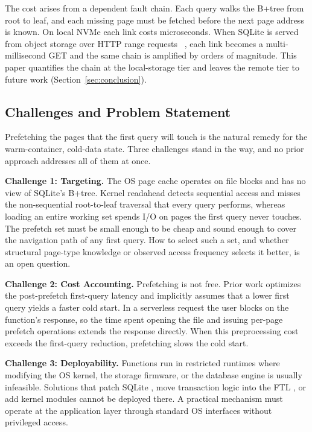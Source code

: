 \documentclass[sigconf, nonacm]{acmart}
\begin{document}
The cost arises from a dependent fault chain. Each query walks the B+tree from root to leaf, and each missing page must be fetched before the next page address is known. On local NVMe each link costs microseconds. When SQLite is served from object storage over HTTP range requests ~\cite{SqliteWebVfs, Turbolite}, each link becomes a multi-millisecond GET and the same chain is amplified by orders of magnitude. This paper quantifies the chain at the local-storage tier and leaves the remote tier to future work (Section~\ref{sec:conclusion}).

\subsection{Challenges and Problem Statement}\label{sec:challenges}

Prefetching the pages that the first query will touch is the natural remedy for the warm-container, cold-data state. Three challenges stand in the way, and no prior approach addresses all of them at once.

\textbf{Challenge 1: Targeting.} The OS page cache operates on file blocks and has no view of SQLite's B+tree. Kernel readahead detects sequential access and misses the non-sequential root-to-leaf traversal that every query performs, whereas loading an entire working set spends I/O on pages the first query never touches. The prefetch set must be small enough to be cheap and sound enough to cover the navigation path of any first query. How to select such a set, and whether structural page-type knowledge or observed access frequency selects it better, is an open question.

\textbf{Challenge 2: Cost Accounting.} Prefetching is not free. Prior work optimizes the post-prefetch first-query latency and implicitly assumes that a lower first query yields a faster cold start. In a serverless request the user blocks on the function's response, so the time spent opening the file and issuing per-page prefetch operations extends the response directly. When this preprocessing cost exceeds the first-query reduction, prefetching slows the cold start.

\textbf{Challenge 3: Deployability.} Functions run in restricted runtimes where modifying the OS kernel, the storage firmware, or the database engine is usually infeasible. Solutions that patch SQLite \cite{VanDeBogart2009}, move transaction logic into the FTL \cite{Kang2013}, or add kernel modules \cite{Leis2023} cannot be deployed there. A practical mechanism must operate at the application layer through standard OS interfaces without privileged access.
\end{document}
